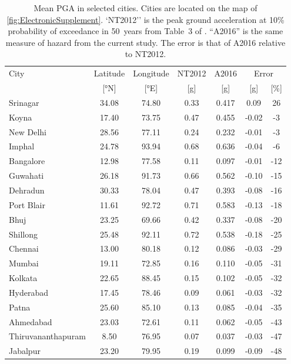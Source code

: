 \documentclass{article}
\begin{document}
\begin{table}
\caption[Mean PGA at 10\% POE in 50~years in selected cities]{
Mean PGA in selected cities. 
Cities are located on the map of \autoref{fig:ElectronicSupplement}.
`NT2012'' is the peak ground acceleration at 10\% probability of exceedance in 50~years from Table~3 of \cite{nath2012probabilistic}. 
``A2016'' is the same measure of hazard from the current study.
The error is that of A2016 relative to NT2012.}
\label{table:CitiesHazard}
\centering
\begin{tabular}{lcccccc}
\toprule
\multirow{2}{*}{City} 
                    & Latitude & Longitude & NT2012 &  A2016 & 
                                                  \multicolumn{2}{c}{Error} \\
                    &     [°N] &      [°E] &    [g] &    [g] &   [g] & [\%] \\
\midrule
           Srinagar &    34.08 &     74.80 &   0.33 &  0.417 &  0.09 &  26 \\
              Koyna &    17.40 &     73.75 &   0.47 &  0.455 & -0.02 &  -3 \\
          New Delhi &    28.56 &     77.11 &   0.24 &  0.232 & -0.01 &  -3 \\
             Imphal &    24.78 &     93.94 &   0.68 &  0.636 & -0.04 &  -6 \\
          Bangalore &    12.98 &     77.58 &   0.11 &  0.097 & -0.01 & -12 \\
           Guwahati &    26.18 &     91.73 &   0.66 &  0.562 & -0.10 & -15 \\
           Dehradun &    30.33 &     78.04 &   0.47 &  0.393 & -0.08 & -16 \\
         Port Blair &    11.61 &     92.72 &   0.71 &  0.583 & -0.13 & -18 \\
               Bhuj &    23.25 &     69.66 &   0.42 &  0.337 & -0.08 & -20 \\
           Shillong &    25.48 &     92.11 &   0.72 &  0.538 & -0.18 & -25 \\
            Chennai &    13.00 &     80.18 &   0.12 &  0.086 & -0.03 & -29 \\
             Mumbai &    19.11 &     72.85 &   0.16 &  0.110 & -0.05 & -31 \\
            Kolkata &    22.65 &     88.45 &   0.15 &  0.102 & -0.05 & -32 \\
          Hyderabad &    17.45 &     78.46 &   0.09 &  0.061 & -0.03 & -32 \\
              Patna &    25.60 &     85.10 &   0.13 &  0.085 & -0.04 & -35 \\
          Ahmedabad &    23.03 &     72.61 &   0.11 &  0.062 & -0.05 & -43 \\
 Thiruvananthapuram &     8.50 &     76.95 &   0.07 &  0.037 & -0.03 & -47 \\
           Jabalpur &    23.20 &     79.95 &   0.19 &  0.099 & -0.09 & -48 \\
\bottomrule
\end{tabular}
\end{table}
\end{document}
